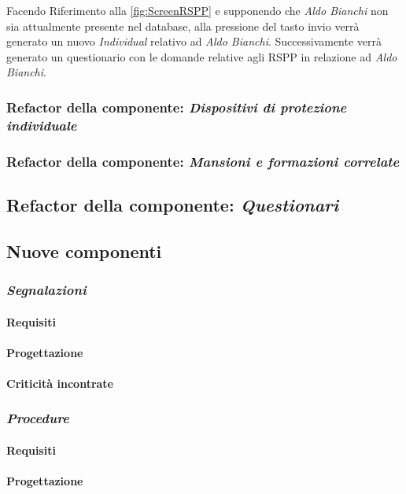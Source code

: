 	Facendo Riferimento alla \autoref{fig:ScreenRSPP} e  supponendo che \textit{Aldo Bianchi} non sia attualmente presente nel database, alla pressione del tasto invio verrà generato un nuovo \textit{Individual} relativo ad \textit{Aldo Bianchi}. Successivamente verrà generato un questionario con le domande relative agli RSPP in relazione ad \textit{Aldo Bianchi}.
	
\subsubsection{Refactor della componente: \textit{Dispositivi di protezione individuale}}
\subsubsection{Refactor della componente: \textit{Mansioni e formazioni correlate}}
\subsection{Refactor della componente: \textit{Questionari}}


\subsection{Nuove componenti}
\subsubsection{\textit{Segnalazioni}}
	\paragraph{Requisiti}
	\paragraph{Progettazione}
	\paragraph{Criticità incontrate}
\subsubsection{\textit{Procedure}}
	\paragraph{Requisiti}
	\paragraph{Progettazione}
